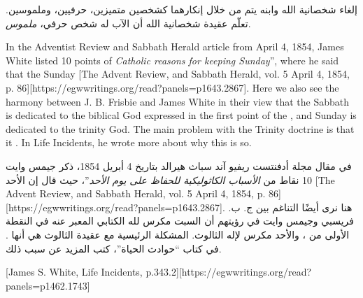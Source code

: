 إلغاء شخصانية الله وابنه يتم من خلال إنكارهما كشخصين متميزين، حرفيين، وملموسين. تعلّم عقيدة شخصانية الله أن الآب له شخص حرفي، \textit{ملموس}.


In the Adventist Review and Sabbath Herald article from April 4, 1854, James White listed 10 points of \textit{Catholic reasons for keeping Sunday}”, where he said that the Sunday [The Advent Review, and Sabbath Herald, vol. 5 April 4, 1854, p. 86][https://egwwritings.org/read?panels=p1643.2867]. Here we also see the harmony between J. B. Frisbie and James White in their view that the Sabbath is dedicated to the biblical God expressed in the first point of the , and Sunday is dedicated to the trinity God. The main problem with the Trinity doctrine is that it . In Life Incidents, he wrote more about why this is so.


في مقال مجلة أدفنتست ريفيو آند سباث هيرالد بتاريخ 4 أبريل 1854، ذكر جيمس وايت 10 نقاط من \textit{الأسباب الكاثوليكية للحفاظ على يوم الأحد}”، حيث قال إن الأحد [The Advent Review, and Sabbath Herald, vol. 5 April 4, 1854, p. 86][https://egwwritings.org/read?panels=p1643.2867]. هنا نرى أيضًا التناغم بين ج. ب. فريسبي وجيمس وايت في رؤيتهم أن السبت مكرس لله الكتابي المعبر عنه في النقطة الأولى من ، والأحد مكرس لإله الثالوث. المشكلة الرئيسية مع عقيدة الثالوث هي أنها . في كتاب “حوادث الحياة”، كتب المزيد عن سبب ذلك.


[James S. White, Life Incidents, p.343.2][https://egwwritings.org/read?panels=p1462.1743]



